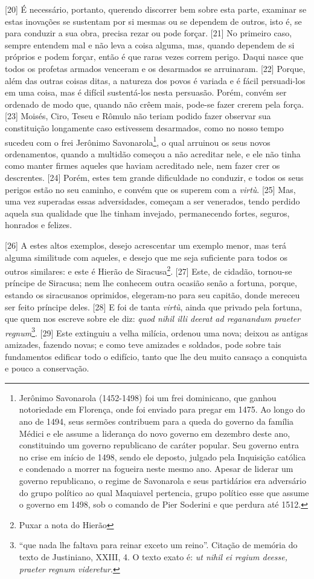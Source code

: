{[}20{]} É necessário, portanto, querendo discorrer bem sobre esta
parte, examinar se estas inovações se sustentam por si mesmas ou se
dependem de outros, isto é, se para conduzir a sua obra, precisa rezar
ou pode forçar. {[}21{]} No primeiro caso, sempre entendem mal e não
leva a coisa alguma, mas, quando dependem de si próprios e podem forçar,
então é que raras vezes correm perigo. Daqui nasce que todos os profetas
armados venceram e os desarmados se arruinaram. {[}22{]} Porque, além
das outras coisas ditas, a natureza dos povos é variada e é fácil
persuadi-los em uma coisa, mas é difícil sustentá-los nesta persuasão.
Porém, convém ser ordenado de modo que, quando não crêem mais, pode-se
fazer crerem pela força. {[}23{]} Moisés, Ciro, Teseu e Rômulo não
teriam podido fazer observar sua constituição longamente caso estivessem
desarmados, como no nosso tempo sucedeu com o frei Jerônimo
Savonarola\footnote{Jerônimo Savonarola (1452-1498) foi um frei
  dominicano, que ganhou notoriedade em Florença, onde foi enviado para
  pregar em 1475. Ao longo do ano de 1494, seus sermões contribuem para
  a queda do governo da família Médici e ele assume a liderança do novo
  governo em dezembro deste ano, constituindo um governo republicano de
  caráter popular. Seu governo entra no crise em início de 1498, sendo
  ele deposto, julgado pela Inquisição católica e condenado a morrer na
  fogueira neste mesmo ano. Apesar de liderar um governo republicano, o
  regime de Savonarola e seus partidários era adversário do grupo
  político ao qual Maquiavel pertencia, grupo político esse que assume o
  governo em 1498, sob o comando de Pier Soderini e que perdura até
  1512.}, o qual arruinou os seus novos ordenamentos, quando a multidão
começou a não acreditar nele, e ele não tinha como manter firmes aqueles
que haviam acreditado nele, nem fazer crer os descrentes. {[}24{]}
Porém, estes tem grande dificuldade no conduzir, e todos os seus perigos
estão no seu caminho, e convém que os superem com a \emph{virtù}.
{[}25{]} Mas, uma vez superadas essas adversidades, começam a ser
venerados, tendo perdido aquela sua qualidade que lhe tinham invejado,
permanecendo fortes, seguros, honrados e felizes.

{[}26{]} A estes altos exemplos, desejo acrescentar um exemplo menor,
mas terá alguma similitude com aqueles, e desejo que me seja suficiente
para todos os outros similares: e este é Hierão de Siracusa\footnote{Puxar
  a nota do Hierão}. {[}27{]} Este, de cidadão, tornou-se príncipe de
Siracusa; nem lhe conhecem outra ocasião senão a fortuna, porque,
estando os siracusanos oprimidos, elegeram-no para seu capitão, donde
mereceu ser feito príncipe deles. {[}28{]} E foi de tanta \emph{virtù},
ainda que privado pela fortuna, que quem nos escreve sobre ele diz:
\emph{quod nihil illi deerat ad reganandum praeter regnum}\footnote{``que
  nada lhe faltava para reinar exceto um reino''. Citação de memória do
  texto de Justiniano, XXIII, 4. O texto exato é: \emph{ut nihil ei
  regium deesse, praeter regnum videretur}.}. {[}29{]} Este extinguiu a
velha milícia, ordenou uma nova; deixou as antigas amizades, fazendo
novas; e como teve amizades e soldados, pode sobre tais fundamentos
edificar todo o edifício, tanto que lhe deu muito cansaço a conquista e
pouco a conservação.

